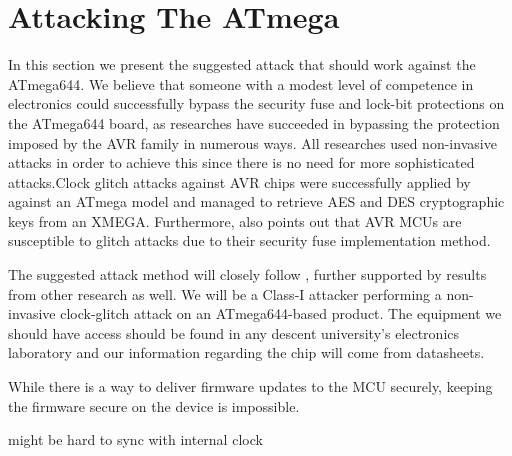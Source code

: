\section{Attacking The ATmega}
\label{sec:attacking_mega}

In this section we present the suggested attack that should work against the ATmega644. We believe that someone with a modest level of competence in electronics could successfully bypass the security fuse and lock-bit protections on the ATmega644 board, as researches have succeeded in bypassing the protection imposed by the AVR family in numerous ways. All researches used non-invasive attacks in order to achieve this since there is no need for more sophisticated attacks.Clock glitch attacks against AVR chips were successfully applied by \citep{glitches_paper} against an ATmega model and \citep{avr_mega} managed to retrieve AES and DES cryptographic keys from an XMEGA. Furthermore, \citep{sergei:thesis} also points out that AVR MCUs are susceptible to glitch attacks due to their security fuse implementation method. 

The suggested attack method will closely follow \citep{glitches_paper}, further supported by results from other research as well. We will be a Class-I attacker performing a non-invasive clock-glitch attack on an ATmega644-based product. The equipment we should have access should be found in any descent university's electronics laboratory and our information regarding the chip will come from datasheets. 


While there is a way to deliver firmware updates to the MCU securely\citep{tech:aes_bls}, keeping the firmware secure on the device is impossible.

might be hard to sync with internal clock \citep{sergei:thesis}\citep{avr_mega}



